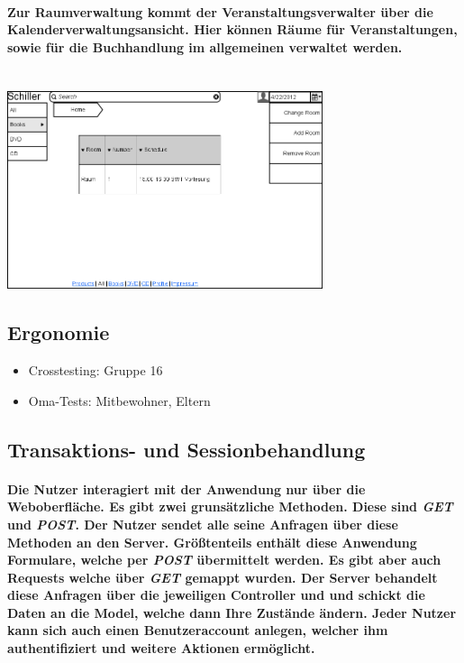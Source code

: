 \documentclass[a4paper]{article}
\begin{document}
\paragraph{Zur Raumverwaltung kommt der Veranstaltungsverwalter über die Kalenderverwaltungsansicht. Hier können Räume für Veranstaltungen, sowie für die Buchhandlung im allgemeinen verwaltet werden.\\ \\}
\includegraphics[width=350px]{19ChangeRoom.png}

\subsection{Ergonomie}

\begin{itemize}
	\item Crosstesting: Gruppe 16
	\item Oma-Tests: Mitbewohner, Eltern
\end{itemize}

\subsection{Transaktions- und Sessionbehandlung}

\paragraph{Die Nutzer interagiert mit der Anwendung nur über die Weboberfläche. Es gibt zwei grunsätzliche Methoden. Diese sind \textit{GET} und \textit{POST}. Der Nutzer sendet alle seine Anfragen über diese Methoden an den Server. Größtenteils enthält diese Anwendung Formulare, welche per \textit{POST} übermittelt werden. Es gibt aber auch Requests welche über \textit{GET} gemappt wurden. Der Server behandelt diese Anfragen über die jeweiligen Controller und und schickt die Daten an die Model, welche dann Ihre Zustände ändern. Jeder Nutzer kann sich auch einen Benutzeraccount anlegen, welcher ihm authentifiziert und weitere Aktionen ermöglicht.}
\end{document}
